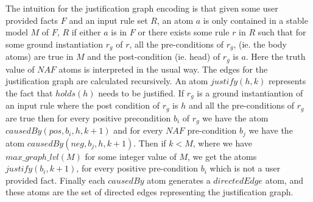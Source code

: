 The intuition for the justification graph encoding is that given some user
provided facts $F$ and an input rule set $R$, an atom $a$ is only contained in
a stable model $M$ of $F$, $R$ if either $a$ is in $F$ or there exists some
rule $r$ in $R$ such that for some ground instantiation $r_{g}$ of $r$, all
the pre-conditions of $r_{g}$, (ie. the body atoms) are true in $M$ and the
post-condition (ie. head) of $r_{g}$ is $a$. Here the truth value of $NAF$
atoms is interpreted in the usual way. The edges for the justification graph
are calculated recursively. An atom $justify(h,k)$ represents the fact that
$holds(h)$ needs to be justified. If $r_{g}$ is a ground instantiantion of an
input rule where the post condition of $r_{g}$ is $h$ and all the
pre-conditions of $r_{g}$ are true then for every positive precondition
$b_{i}$ of $r_{g}$ we have the atom $causedBy(pos,b_{i},h,k+1)$ and for every
$NAF$ pre-condition $b_{j}$ we have the atom $causedBy(neg,b_{j},h,k+1)$. Then
if $k<M$, where we have $max\_graph\_lvl(M)$ for some integer value of $M$, we get the atoms $justify(b_{i},k+1)$, for every
positive pre-condition $b_{i}$ which is not a user provided fact. Finally each $causedBy$ atom generates a
$directedEdge$ atom, and these atoms are the set of directed edges
representing the justification graph.


